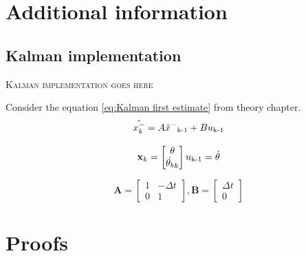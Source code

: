 \documentclass[a4paper,11pt]{kth-mag}
\begin{document}
%
\cleardoublepage


\cleardoublepage
\appendix
{}


\chapter{Additional information} \label{appA}
\section{Kalman implementation}
\textsc{Kalman implementation goes here}

Consider the equation \eqref{eq:Kalman first estimate} from theory chapter.
\begin{equation}
\hat{x^-_k} = A\hat{x}^-\textsubscript{k-1}+Bu\textsubscript{k-1}
\end{equation}


\begin{equation}
\textbf{x}_k = \begin{bmatrix}
\theta \\
\dot{\theta_b}_k
\end{bmatrix}
u\textsubscript{k-1} = \dot{\theta}
\end{equation}

\begin{equation}
\textbf{A} = \begin{bmatrix}
1  & -\Delta t \\
0   & 1
\end{bmatrix}
,
\textbf{B} = \begin{bmatrix}
\Delta t \\ 0
\end{bmatrix}
\end{equation}
\chapter{Proofs} \label{appB}

\cleardoublepage   
\cleartoverso %
%

\end{document}
